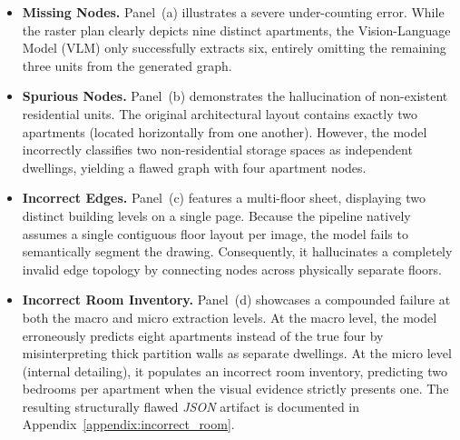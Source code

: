 \documentclass[12pt,a4paper,openright]{report}
\begin{document}
\begin{itemize}
    \item \textbf{Missing Nodes.} Panel~(a) illustrates a severe under-counting error. While the raster plan clearly depicts nine distinct apartments, the Vision-Language Model (VLM) only successfully extracts six, entirely omitting the remaining three units from the generated graph.
    \item \textbf{Spurious Nodes.} Panel~(b) demonstrates the hallucination of non-existent residential units. The original architectural layout contains exactly two apartments (located horizontally from one another). However, the model incorrectly classifies two non-residential storage spaces as independent dwellings, yielding a flawed graph with four apartment nodes.
    \item \textbf{Incorrect Edges.} Panel~(c) features a multi-floor sheet, displaying two distinct building levels on a single page. Because the pipeline natively assumes a single contiguous floor layout per image, the model fails to semantically segment the drawing. Consequently, it hallucinates a completely invalid edge topology by connecting nodes across physically separate floors.
    \item \textbf{Incorrect Room Inventory.} Panel~(d) showcases a compounded failure at both the macro and micro extraction levels. At the macro level, the model erroneously predicts eight apartments instead of the true four by misinterpreting thick partition walls as separate dwellings. At the micro level (internal detailing), it populates an incorrect room inventory, predicting two bedrooms per apartment when the visual evidence strictly presents one. The resulting structurally flawed \textit{JSON} artifact is documented in Appendix~\ref{appendix:incorrect_room}.
\end{itemize}
\end{document}
